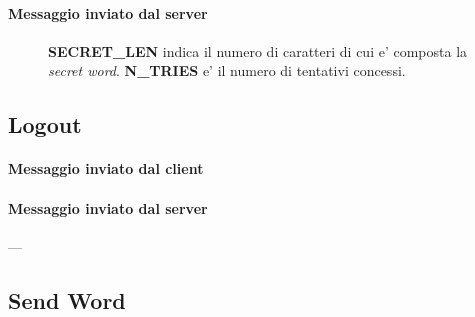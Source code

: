\paragraph{Messaggio inviato dal server}

\begin{lrbox}{\asciiart}
	\begin{varwidth}{\maxdimen}
		\noindent
	\end{varwidth}
\end{lrbox}%

\begin{center}
	\begin{figure}[h]
		\makebox[\textwidth]{\showasciiart{50ex}}
		\centering \textbf{SECRET\_LEN} indica il numero di caratteri di cui e' composta la \emph{secret word}. \textbf{N\_TRIES} e' il numero di tentativi concessi.
	\end{figure}
\end{center}

\newpage

\subsection{Logout}

\paragraph{Messaggio inviato dal client}

\begin{lrbox}{\asciiart}
	\begin{varwidth}{\maxdimen}
		\noindent
	\end{varwidth}
\end{lrbox}%

\begin{center}
	\begin{figure}[h]
		\makebox[\textwidth]{\showasciiart{40ex}}
	\end{figure}
\end{center}

\paragraph{Messaggio inviato dal server}

---

\subsection{Send Word}

